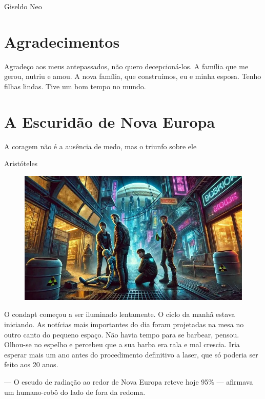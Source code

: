 \documentclass[a4paper,14pt]{book}
\begin{document}
\begin{flushright}
Giseldo Neo
\end{flushright}

\tableofcontents

\chapter*{Agradecimentos}

Agradeço aos meus antepassados, não quero decepcioná-los. A família que me gerou, nutriu e amou. A nova família, que construímos, eu e minha esposa. Tenho filhas lindas. Tive um bom tempo no mundo.

\chapter{A Escuridão de Nova Europa}

\epigraph{A coragem não é a ausência de medo, mas o triunfo sobre ele}{Aristóteles}

\begin{figure}[h!]
    \includegraphics[width=1\linewidth]{img/a_escurida_de_nova_europa.jpg}
\end{figure}

O condapt começou a ser iluminado lentamente. O ciclo da manhã estava iniciando. As notícias mais importantes do dia foram projetadas na mesa no outro canto do pequeno espaço. Não havia tempo para se barbear, pensou. Olhou-se no espelho e percebeu que a sua barba era rala e mal crescia. Iria esperar mais um ano antes do procedimento definitivo a laser, que só poderia ser feito aos 20 anos.

— O escudo de radiação ao redor de Nova Europa reteve hoje 95\% — afirmava um humano-robô do lado de fora da redoma.
\end{document}
